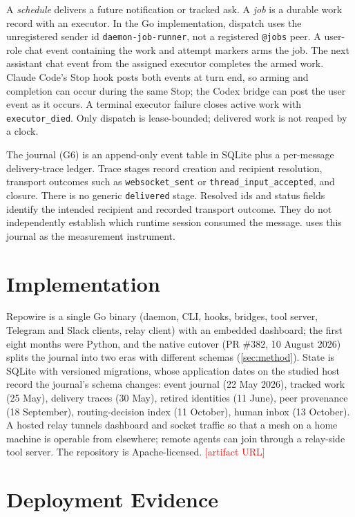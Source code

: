 \documentclass[10pt,twocolumn]{article}
\newcommand{\todo}[1]{\textcolor{red}{[#1]}}
\newcommand{\sys}{Repowire}
\newcommand{\code}[1]{\texttt{#1}}
\begin{document}
A \emph{schedule} delivers a future notification or tracked ask. A \emph{job} is a durable work record with an executor. In the Go implementation, dispatch uses the unregistered sender id \code{daemon-job-runner}, not a registered \code{@jobs} peer. A user-role chat event containing the work and attempt markers arms the job. The next assistant chat event from the assigned executor completes the armed work. Claude Code's Stop hook posts both events at turn end, so arming and completion can occur during the same Stop; the Codex bridge can post the user event as it occurs. A terminal executor failure closes active work with \code{executor\_died}. Only dispatch is lease-bounded; delivered work is not reaped by a clock.

The journal (G6) is an append-only event table in SQLite plus a per-message delivery-trace ledger. Trace stages record creation and recipient resolution, transport outcomes such as \code{websocket\_sent} or \code{thread\_input\_accepted}, and closure. There is no generic \code{delivered} stage. Resolved ids and status fields identify the intended recipient and recorded transport outcome. They do not independently establish which runtime session consumed the message.  uses this journal as the measurement instrument.

\section{Implementation}
\label{sec:impl}

\sys{} is a single Go binary (daemon, CLI, hooks, bridges, tool server, Telegram and Slack clients, relay client) with an embedded dashboard; the first eight months were Python, and the native cutover (PR \#382, 10 August 2026) splits the journal into two eras with different schemas (\cref{sec:method}). State is SQLite with versioned migrations, whose application dates on the studied host record the journal's schema changes: event journal (22 May 2026), tracked work (25 May), delivery traces (30 May), retired identities (11 June), peer provenance (18 September), routing-decision index (11 October), human inbox (13 October). A hosted relay tunnels dashboard and socket traffic so that a mesh on a home machine is operable from elsewhere; remote agents can join through a relay-side tool server. The repository is Apache-licensed. \todo{artifact URL}

\section{Deployment Evidence}
\label{sec:eval}
\end{document}
